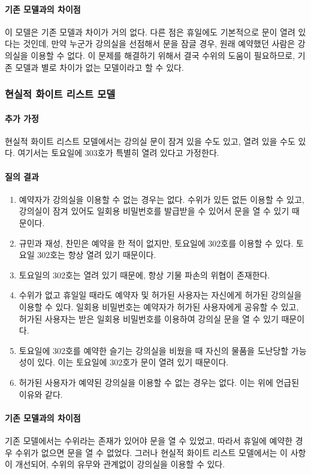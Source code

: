 \documentclass[11pt,a4paper]{article}
\begin{document}
\paragraph{기존 모델과의 차이점}
\hfill\break
\indent
이 모델은 기존 모델과 차이가 거의 없다. 다른 점은 휴일에도 기본적으로 문이 열려
있다는 것인데, 만약 누군가 강의실을 선점해서 문을 잠글 경우, 원래 예약했던
사람은 강의실을 이용할 수 없다. 이 문제를 해결하기 위해서 결국 수위의 도움이
필요하므로, 기존 모델과 별로 차이가 없는 모델이라고 할 수 있다.

\subsubsection{현실적 화이트 리스트 모델}

\paragraph{추가 가정}
현실적 화이트 리스트 모델에서는 강의실 문이 잠겨 있을 수도 있고, 열려 있을 수도
있다. 여기서는 토요일에 303호가 특별히 열려 있다고 가정한다.

\paragraph{질의 결과}
\begin{enumerate}
\item 예약자가 강의실을 이용할 수 없는 경우는 없다. 수위가 있든 없든 이용할 수
있고, 강의실이 잠겨 있어도 일회용 비밀번호를 발급받을 수 있어서 문을 열 수 있기
때문이다.
\item 규민과 재성, 찬민은 예약을 한 적이 없지만, 토요일에 302호를 이용할 수
있다. 토요일 302호는 항상 열려 있기 때문이다.
\item 토요일의 302호는 열려 있기 때문에, 항상 기물 파손의 위협이 존재한다.
\item 수위가 없고 휴일일 때라도 예약자 및 허가된 사용자는 자신에게 허가된
강의실을 이용할 수 있다. 일회용 비밀번호는 예약자가 허가된 사용자에게 공유할 수
있고, 허가된 사용자는 받은 일회용 비밀번호를 이용하여 강의실 문을 열 수 있기
때문이다.
\item 토요일에 302호를 예약한 슬기는 강의실을 비웠을 때 자신의 물품을 도난당할
가능성이 있다. 이는 토요일에 302호가 문이 열려 있기 때문이다.
\item 허가된 사용자가 예약된 강의실을 이용할 수 없는 경우는 없다. 이는 위에
언급된 이유와 같다.
\end{enumerate}

\paragraph{기존 모델과의 차이점}
\hfill\break
\indent
기존 모델에서는 수위라는 존재가 있어야 문을 열 수 있었고, 따라서 휴일에 예약한
경우 수위가 없으면 문을 열 수 없었다. 그러나 현실적 화이트 리스트 모델에서는 이
사항이 개선되어, 수위의 유무와 관계없이 강의실을 이용할 수 있다.
\end{document}
